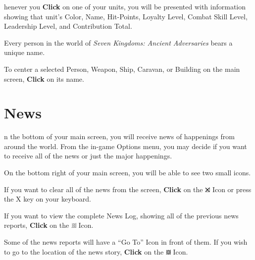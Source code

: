 
henever you \textbf{Click} on one of your units, you will be presented with information showing that unit’s Color, Name, Hit-Points, Loyalty Level, Combat Skill Level, Leadership Level, and Contribution Total.

Every person in the world of \textit{Seven Kingdoms: Ancient Adversaries} bears a unique name.


To center a selected Person, Weapon, Ship, Caravan, or Building on the main screen, \textbf{Click} on its name.

\section{\textsf{News}}



n the bottom of your main screen, you will receive news of happenings from around the world. From the in-game Options menu, you may decide if you want to receive all of the news or just the major happenings.

On the bottom right of your main screen, you will be able to see two small icons.


If you want to clear all of the news from the screen, \textbf{Click} on the \includegraphics[width=0.03\linewidth]{Bx} Icon or press the X key on your keyboard.

If you want to view the complete News Log, showing all of the previous news reports, \textbf{Click} on the \includegraphics[width=0.03\linewidth]{Bnews} Icon.


Some of the news reports will have a “Go To” Icon in front of them. If you wish to go to the location of the news story, \textbf{Click} on the \includegraphics[width=0.03\linewidth]{Bgoto} Icon.